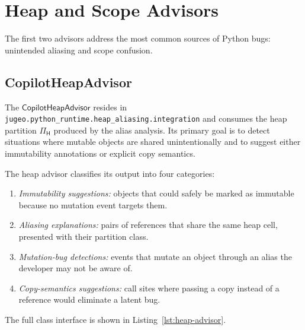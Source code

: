 \documentclass[11pt]{article}
\newcommand{\HeapPart}{\Pi_{\mathsf{H}}}
\begin{document}
\section{Heap and Scope Advisors}\label{sec:heap-scope}

The first two advisors address the most common sources of Python bugs:
unintended aliasing and scope confusion.

\subsection{CopilotHeapAdvisor}\label{sec:heap-advisor}

The $\mathsf{CopilotHeapAdvisor}$ resides in
\texttt{jugeo.python\_runtime.heap\_aliasing.integration} and consumes
the heap partition $\HeapPart$ produced by the alias analysis.  Its
primary goal is to detect situations where mutable objects are shared
unintentionally and to suggest either immutability annotations or
explicit copy semantics.

\begin{definition}\label{def:heap-cat}
The heap advisor classifies its output into four categories:
\begin{enumerate}
  \item \emph{Immutability suggestions:} objects that could safely be
    marked as immutable because no mutation event targets them.
  \item \emph{Aliasing explanations:} pairs of references that share
    the same heap cell, presented with their partition class.
  \item \emph{Mutation-bug detections:} events that mutate an object
    through an alias the developer may not be aware of.
  \item \emph{Copy-semantics suggestions:} call sites where passing a
    copy instead of a reference would eliminate a latent bug.
\end{enumerate}
\end{definition}

The full class interface is shown in Listing~\ref{lst:heap-advisor}.
\end{document}
